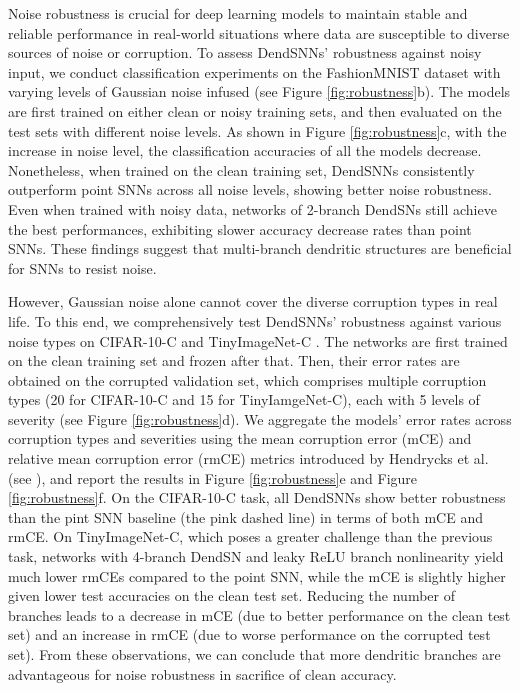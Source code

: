 Noise robustness is crucial for deep learning models to maintain stable and reliable performance in real-world situations where data are susceptible to diverse sources of noise or corruption. To assess DendSNNs' robustness against noisy input, we conduct classification experiments on the FashionMNIST dataset \cite{xiao2017fashionmnist} with varying levels of Gaussian noise infused (see Figure \ref{fig:robustness}b). The models are first trained on either clean or noisy training sets, and then evaluated on the test sets with different noise levels. As shown in Figure \ref{fig:robustness}c, with the increase in noise level, the classification accuracies of all the models decrease. Nonetheless, when trained on the clean training set, DendSNNs consistently outperform point SNNs across all noise levels, showing better noise robustness. Even when trained with noisy data, networks of 2-branch DendSNs still achieve the best performances, exhibiting slower accuracy decrease rates than point SNNs. These findings suggest that multi-branch dendritic structures are beneficial for SNNs to resist noise.

However, Gaussian noise alone cannot cover the diverse corruption types in real life. To this end, we comprehensively test DendSNNs' robustness against various noise types on CIFAR-10-C and TinyImageNet-C \cite{hendrycks2019benchmarking}. The networks are first trained on the clean training set and frozen after that. Then, their error rates are obtained on the corrupted validation set, which comprises multiple corruption types (20 for CIFAR-10-C and 15 for TinyIamgeNet-C), each with 5 levels of severity (see Figure \ref{fig:robustness}d). We aggregate the models' error rates across corruption types and severities using the mean corruption error (mCE) and relative mean corruption error (rmCE) metrics introduced by Hendrycks et al. \cite{hendrycks2019benchmarking} (see ), and report the results in Figure \ref{fig:robustness}e and Figure \ref{fig:robustness}f. On the CIFAR-10-C task, all DendSNNs show better robustness than the pint SNN baseline (the pink dashed line) in terms of both mCE and rmCE. On TinyImageNet-C, which poses a greater challenge than the previous task, networks with 4-branch DendSN and leaky ReLU branch nonlinearity yield much lower rmCEs compared to the point SNN, while the mCE is slightly higher given lower test accuracies on the clean test set. Reducing the number of branches leads to a decrease in mCE (due to better performance on the clean test set) and an increase in rmCE (due to worse performance on the corrupted test set). From these observations, we can conclude that more dendritic branches are advantageous for noise robustness in sacrifice of clean accuracy.

